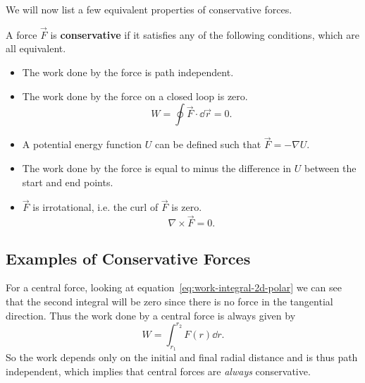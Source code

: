 \documentclass[../classical_mechanics.tex]{subfiles}
\begin{document}
            We will now list a few equivalent properties of conservative forces.
            \begin{definition}\label{def:conservative-force}
                A force $\vec{F}$ is \textbf{conservative} if it satisfies any of the following conditions, which are all equivalent.
                \begin{itemize}
                    \item The work done by the force is path independent.
                    \item The work done by the force on a closed loop is zero.
                    \begin{equation}
                        W=\oint\vec{F}\cdot\dd{\vec{r}}=0.
                    \end{equation}
                    \item A potential energy function $U$ can be defined such that $\vec{F}=-\nabla U$.
                    \item The work done by the force is equal to minus the difference in $U$ between the start and end points.
                    \item $\vec{F}$ is irrotational, i.e. the curl of $\vec{F}$ is zero.
                    \begin{equation}
                        \nabla\times\vec{F}=0.
                    \end{equation}
                \end{itemize}
            \end{definition}

        \subsection{Examples of Conservative Forces}\label{subsec:examples-of-conservative-forces}
            For a central force, looking at equation~\ref{eq:work-integral-2d-polar} we can see that the second integral will be zero since there is no force in the tangential direction.
            Thus the work done by a central force is always given by
            \begin{equation}
                W=\int_{r_1}^{r_2}F(r)\dd{r}.
            \end{equation}
            So the work depends only on the initial and final radial distance and is thus path independent, which implies that central forces are \textit{always} conservative.
\end{document}
